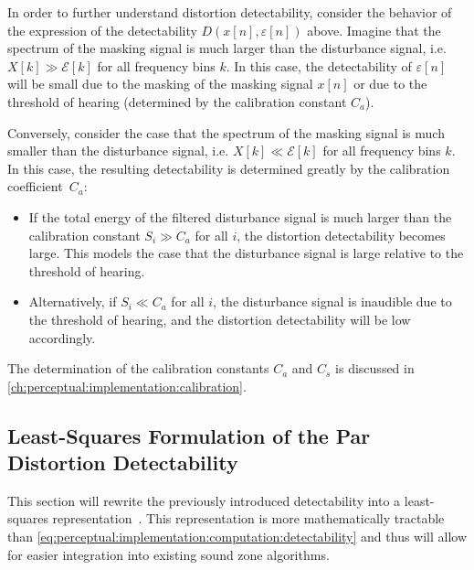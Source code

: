 In order to further understand distortion detectability, consider the behavior of the expression of the 
detectability $D(x[n],\varepsilon[n])$ above.
Imagine that the spectrum of the masking signal is much larger than the disturbance signal, 
i.e. $X[k] \gg \mathcal{E}[k]$ for all frequency bins $k$.
In this case, the detectability of $\varepsilon[n]$ will be small due to the masking of the masking signal $x[n]$ or
due to the threshold of hearing (determined by the calibration constant $C_a$).

Conversely, consider the case that the spectrum of the masking signal is much smaller than the disturbance signal,
i.e. $X[k] \ll \mathcal{E}[k]$ for all frequency bins $k$.
In this case, the resulting detectability is determined greatly by the calibration coefficient~$C_a$: 
\begin{itemize}
    \item If the total energy of the filtered disturbance signal is much larger than the calibration constant 
        $S_i \gg C_a$ for all $i$, the distortion detectability becomes large.
        This models the case that the disturbance signal is large relative to the threshold of hearing.
    \item Alternatively, if $S_i \ll C_a$ for all $i$, the disturbance signal is inaudible due to the threshold of hearing, and the distortion detectability will be low accordingly.
\end{itemize}

The determination of the calibration constants $C_a$ and $C_s$ is discussed in \autoref{ch:perceptual:implementation:calibration}.


\subsection{Least-Squares Formulation of the Par Distortion Detectability}
\label{ch:perceptual:implementation:least_squares}
This section will rewrite the previously introduced detectability into a least-squares representation~\cite{taal2012low}. 
This representation is more mathematically tractable than 
\autoref{eq:perceptual:implementation:computation:detectability} and thus 
will allow for easier integration into existing sound zone algorithms.

